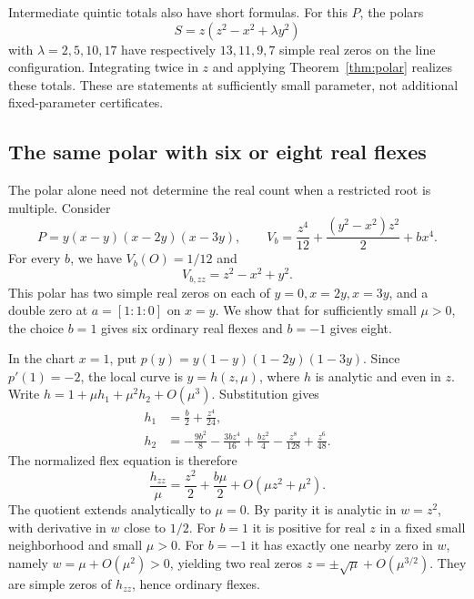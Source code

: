 \documentclass[11pt,a4paper]{article}
\theoremstyle{remark}
\begin{document}
Intermediate quintic totals also have short formulas.
For this \(P\), the polars
\[
                 S=z(z^2-x^2+\lambda y^2)
\]
with \(\lambda=2,5,10,17\) have respectively \(13,11,9,7\)
simple real zeros on the line configuration. Integrating
twice in \(z\) and applying Theorem~\ref{thm:polar} realizes
these totals. These are statements at sufficiently small
parameter, not additional fixed-parameter certificates.

\subsection{The same polar with six or eight real flexes}\label{sec:samepolar}

The polar alone need not determine the real count when a restricted
root is multiple. Consider
\begin{equation}\label{eq:samepolar}
 P=y(x-y)(x-2y)(x-3y),\qquad
 V_b=\frac{z^4}{12}+\frac{(y^2-x^2)z^2}{2}+bx^4.
\end{equation}
For every \(b\), we have \(V_b(O)=1/12\) and
\[
                         V_{b,zz}=z^2-x^2+y^2.
\]
This polar has two simple real zeros on each of
\(y=0,x=2y,x=3y\), and a double zero at \(a=[1:1:0]\)
on \(x=y\). We show that for sufficiently small \(\mu>0\),
the choice \(b=1\) gives six ordinary real flexes and
\(b=-1\) gives eight.

In the chart \(x=1\), put \(p(y)=y(1-y)(1-2y)(1-3y)\).
Since \(p'(1)=-2\), the local curve is \(y=h(z,\mu)\),
where \(h\) is analytic and even in \(z\). Write
\(h=1+\mu h_1+\mu^2h_2+O(\mu^3)\). Substitution gives
\[
 \begin{split}
 h_1&=\frac b2+\frac{z^4}{24},\\
 h_2&=-\frac{9b^2}{8}-\frac{3bz^4}{16}
       +\frac{bz^2}{4}-\frac{z^8}{128}+\frac{z^6}{48}.
 \end{split}
\]
The normalized flex equation is therefore
\begin{equation}\label{eq:doubleunfold}
 \frac{h_{zz}}{\mu}
             =\frac{z^2}{2}+\frac{b\mu}{2}
                       +O(\mu z^2+\mu^2).
\end{equation}
The quotient extends analytically to \(\mu=0\).
By parity it is analytic in \(w=z^2\), with derivative
in \(w\) close to \(1/2\). For \(b=1\) it is positive
for real \(z\) in a fixed small neighborhood and small
\(\mu>0\). For \(b=-1\) it has exactly one nearby
zero in \(w\), namely \(w=\mu+O(\mu^2)>0\), yielding
two real zeros
\(z=\pm\sqrt{\mu}+O(\mu^{3/2})\).
They are simple zeros of \(h_{zz}\), hence ordinary flexes.
\end{document}
